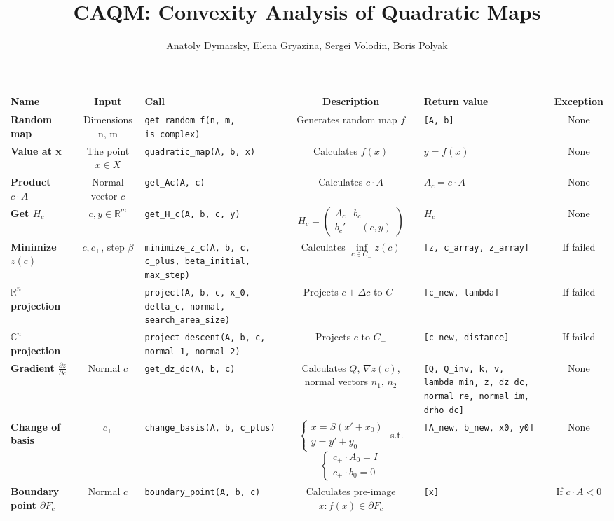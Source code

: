 \documentclass[a4paper]{article}
\title{CAQM: Convexity Analysis of Quadratic Maps}
\date{}
\author{Anatoly Dymarsky, Elena Gryazina, Sergei Volodin, Boris Polyak}
\newcommand{\R}{\mathbb{R}}
\begin{document}
\maketitle
\begin{tabular}{|p{28mm}|c|p{50mm}|c|p{30mm}|c|}
	\hline
	\bf Name & \bf Input & \bf Call & \bf Description & \bf Return value & \bf Exception\\\hline
	\bf Random map & {Dimensions n, m} & {\tt get\_random\_f(n, m, is\_complex)} & Generates random map $f$ & {\tt [A, b]} & None\\\hline
	\bf Value at x & The point $x\in X$ & {\tt quadratic\_map(A, b, x)} & Calculates $f(x)$ & $y=f(x)$ & None\\\hline
	\bf Product $c\cdot A$ & Normal vector $c$ & {\tt get\_Ac(A, c)} & Calculates $c\cdot A$ & $A_c=c\cdot A$ & None\\\hline
	\bf Get $H_c$ & $c,y\in\R^m$ & {\tt get\_H\_c(A, b, c, y)} & $H_c=\left(\begin{array}{cc}A_c & b_c\\b_c' &-(c,y) \end{array}\right)$ & $H_c$ & None\\\hline
	\bf Minimize $z(c)$ & $c,c_+$, step $\beta$ & {\tt minimize\_z\_c(A, b, c, c\_plus, beta\_initial, max\_step)} & Calculates $\inf\limits_{c\in C_-}z(c)$ & {\tt [z, c\_array, z\_array]} & If failed\\\hline
	\bf  $\R^n$ projection & & {\tt project(A, b, c, x\_0, delta\_c, normal, search\_area\_size)} & Projects $c+\Delta c$ to $C_-$ & {\tt [c\_new, lambda]} & If failed\\\hline
	\bf $\mathbb{C}^n$ projection & & {\tt project\_descent(A, b, c, normal\_1, normal\_2)} & Projects $c$ to $C_-$ & {\tt [c\_new, distance]} & If failed\\\hline
	\bf Gradient $\frac{\partial z}{\partial c}$ & Normal $c$ & {\tt get\_dz\_dc(A, b, c)} & Calculates $Q$, $\nabla z(c)$, normal vectors $n_1$, $n_2$ & {\tt [Q, Q\_inv, k, v, lambda\_min, z, dz\_dc, normal\_re, normal\_im, drho\_dc]} & None\\\hline
	\bf Change of basis & $c_+$ & {\tt change\_basis(A, b, c\_plus)} & $\begin{cases}
	x = S(x'+x_0)\\
	y = y' + y_0
	\end{cases}
	$ s.t.
	$\begin{cases}
	c_+\cdot A_0=I\\
	c_+\cdot b_0=0
	\end{cases}$ & {\tt [A\_new, b\_new, x0, y0]} & None\\\hline
	\bf Boundary point $\partial F_c$ & Normal $c$ & {\tt boundary\_point(A, b, c)} & Calculates pre-image $x\colon f(x)\in\partial F_c$ & {\tt [x]} & If $c\cdot A<0$\\\hline
\end{tabular}
\end{document}
